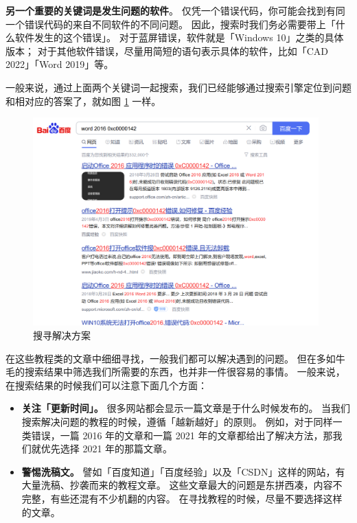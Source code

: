 \textbf{另一个重要的关键词是发生问题的软件}。
仅凭一个错误代码，你可能会找到有同一个错误代码的来自不同软件的不同问题。
因此，搜索时我们务必需要带上「什么软件发生的这个错误」。
对于蓝屏错误，软件就是「Windows 10」之类的具体版本；
对于其他软件错误，尽量用简短的语句表示具体的软件，比如「CAD 2022」「Word 2019」等。

一般来说，通过上面两个关键词一起搜索，我们已经能够通过搜索引擎定位到问题和相对应的答案了，就如图 \ref{Find_Solutions} 一样。

\begin{figure}[htb!]
  \centering
  \includegraphics[width=11cm]{assets/Find_Solutions.png}
  \caption{搜寻解决方案}
  \label{Find_Solutions}
\end{figure}

在这些教程类的文章中细细寻找，一般我们都可以解决遇到的问题。
但在多如牛毛的搜索结果中筛选我们所需要的东西，也并非一件很容易的事情。
一般来说，在搜索结果的时候我们可以注意下面几个方面：

\begin{itemize}
  \item \textbf{关注「更新时间」。}
    很多网站都会显示一篇文章是于什么时候发布的。
    当我们搜索解决问题的教程的时候，遵循「越新越好」的原则。
    例如，对于同样一类错误，一篇 2016 年的文章和一篇 2021 年的文章都给出了解决方法，那我们就优先选择 2021 年的那篇文章。
  \item \textbf{警惕洗稿文。}
    譬如「百度知道」「百度经验」以及「CSDN」这样的网站，有大量洗稿、抄袭而来的教程文章。
    这些文章最大的问题是东拼西凑，内容不完整，有些还混有不少机翻的内容。
    在寻找教程的时候，尽量不要选择这样的文章。
\end{itemize}

\practice

